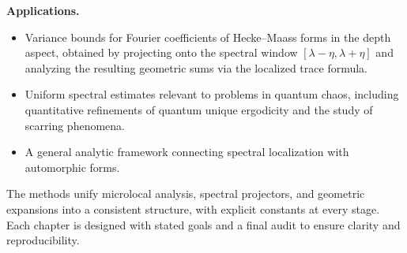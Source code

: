\medskip

\noindent \textbf{Applications.}
\begin{itemize}
  \item Variance bounds for Fourier coefficients of Hecke–Maass forms in the
  depth aspect, obtained by projecting onto the spectral window
  $[\lambda-\eta,\lambda+\eta]$ and analyzing the resulting geometric sums via
  the localized trace formula.
  \item Uniform spectral estimates relevant to problems in quantum chaos,
  including quantitative refinements of quantum unique ergodicity and the study
  of scarring phenomena.
  \item A general analytic framework connecting spectral localization with
  automorphic forms.
\end{itemize}

\medskip

The methods unify microlocal analysis, spectral projectors, and geometric
expansions into a consistent structure, with explicit constants at every stage.
Each chapter is designed with stated goals and a final audit to ensure clarity
and reproducibility.
